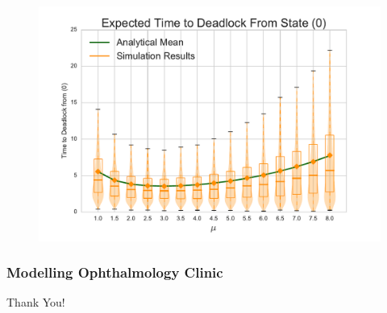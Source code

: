 \documentclass{beamer}
\begin{document}
\begin{frame}
\begin{figure}
    \includegraphics[width=\textwidth]{varymu_1Nms}
\end{figure}
\end{frame}

\begin{frame}
\frametitle{Modelling Ophthalmology Clinic}
\begin{figure}
    
\end{figure}
\end{frame}

\begin{frame}
\begin{center}
\huge Thank You!
\end{center}
\end{frame}
\end{document}
